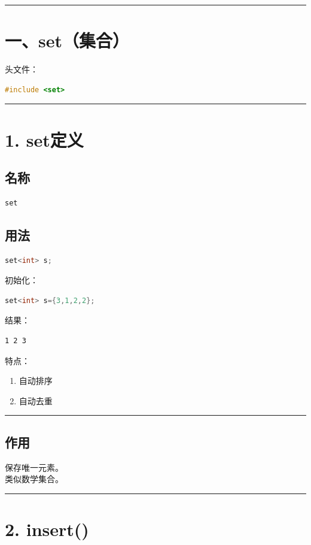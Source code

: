 \documentclass[10pt,twocolumn]{extarticle}
\begin{document}
\noindent\rule{\linewidth}{0.4pt}

\section{一、set（集合）}

头文件：
\begin{lstlisting}[language=C++]
#include <set>
\end{lstlisting}

\noindent\rule{\linewidth}{0.4pt}

\section{1. set定义}

\subsection{名称}
\begin{lstlisting}[language=C++]
set
\end{lstlisting}

\subsection{用法}
\begin{lstlisting}[language=C++]
set<int> s;
\end{lstlisting}
初始化：
\begin{lstlisting}[language=C++]
set<int> s={3,1,2,2};
\end{lstlisting}
结果：
\begin{lstlisting}
1 2 3
\end{lstlisting}

特点：
\begin{enumerate}
    \item 自动排序
    \item 自动去重
\end{enumerate}

\noindent\rule{\linewidth}{0.4pt}

\subsection{作用}
保存唯一元素。\\
类似数学集合。

\noindent\rule{\linewidth}{0.4pt}

\section{2. insert()}
\end{document}
